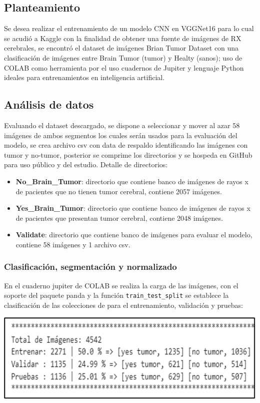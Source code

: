 \documentclass[12pt,twoside,titlepage]{ingenius}
\newenvironment{figura}
  {\par\bigskip\noindent\minipage{\linewidth}}
  {\endminipage\par\bigskip}
\begin{document}
\begin{multicols}{2}
\subsection{Planteamiento}
Se desea realizar el entrenamiento de un modelo CNN en VGGNet16 para lo cual se acudió a Kaggle  con la finalidad de obtener una fuente de imágenes de RX cerebrales, se encontró el dataset de imágenes Brian Tumor Dataset  con una clasificación de imágenes entre Brain Tumor (tumor) y Healty (sanos); uso de COLAB  como herramienta por el uso cuadernos de Jupiter y lenguaje Python ideales para entrenamientos en inteligencia artificial. 
\subsection{Análisis de datos}
Evaluando el dataset descargado, se dispone a seleccionar y mover al azar 58 imágenes de ambos segmentos los cuales serán usados para la evaluación del modelo, se crea archivo csv con data de respaldo identificando las imágenes con tumor y no-tumor, posterior se comprime los directorios y se hospeda en GitHub  para uso público y del estudio.
Detalle de directorios:
\begin{itemize}
	\item \textbf{No\_Brain\_Tumor}: directorio que contiene banco de imágenes de rayos x de pacientes que no tienen tumor cerebral, contiene 2057 imágenes.
	\item \textbf{Yes\_Brain\_Tumor}: directorio que contiene banco de imágenes de rayos x de pacientes que presentan tumor cerebral, contiene 2048 imágenes.
	\item \textbf{Validate}: directorio que contiene banco de imágenes para evaluar el modelo, contiene 58 imágenes y 1 archivo csv.
\end{itemize}

\subsubsection{Clasificación, segmentación y normalizado} 
En el cuaderno jupiter de COLAB se realiza la carga de las imágenes, con el soporte del paquete panda y la función \texttt{train\_test\_split} se establece la clasificación de las colecciones de para el entrenamiento, validación y pruebas:

\begin{figura}%
	\centering
	\includegraphics[scale=0.52]{figuras/fig1.png}
	\label{figura1}
\end{figura}


\end{multicols}
\end{document}
